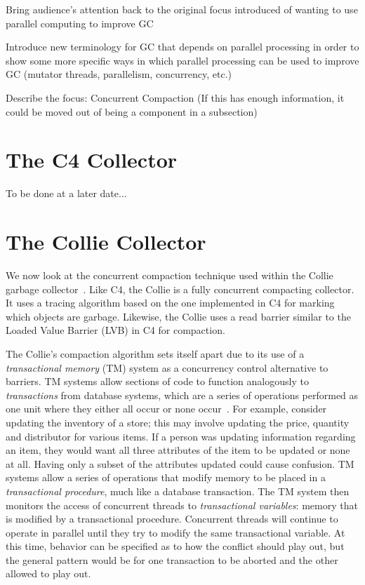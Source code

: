 \documentclass{sig-alternate}
\begin{document}
Bring audience's attention back to the original focus introduced 
of wanting to use parallel computing to improve GC

Introduce new terminology for GC that depends on parallel processing 
in order to show some more specific ways in which parallel processing 
can be used to improve GC (mutator threads, parallelism, concurrency, etc.)

Describe the focus: Concurrent Compaction (If this has enough information, 
it could be moved out of being a component in a subsection)


\section{The C4 Collector}
\label{sec:c4}

To be done at a later date...


\section{The Collie Collector}
\label{sec:collie}

We now look at the concurrent compaction technique used within the 
Collie garbage collector~\cite{Iyengar:Collie}. Like C4, the Collie is 
a fully concurrent compacting collector. It 
uses a tracing algorithm based on the one implemented in C4 for 
marking which objects are garbage. Likewise, the Collie uses a read
barrier similar to the Loaded Value Barrier (LVB) in C4 for 
compaction.

The Collie's compaction algorithm sets itself apart due to its use of a \emph{transactional memory} 
(TM) system as a concurrency control alternative to barriers. TM systems allow
sections of code to function 
analogously to \emph{transactions} from database systems, 
which are a series of operations performed as one unit where they either all
occur or none occur~\cite{wiki:atomicity}.
For example, consider updating the inventory of a store; this may involve updating
the price, quantity and distributor for various items. 
If a person was updating information regarding an item, they would 
want all three attributes of the item to be updated or none at all. Having
only a subset of the attributes updated could cause confusion.
TM systems allow a series
of operations that modify memory to be placed in
a \emph{transactional procedure}, much like a database transaction.
The TM system then monitors the access of concurrent threads to \emph{transactional variables}:
memory that is modified by a transactional procedure.
Concurrent threads will continue to operate in parallel until they try to modify
the same transactional variable. At this time, behavior can be specified as to how 
the conflict should play out, but the general pattern would be for one transaction
to be aborted and the other allowed to play out.
\end{document}
